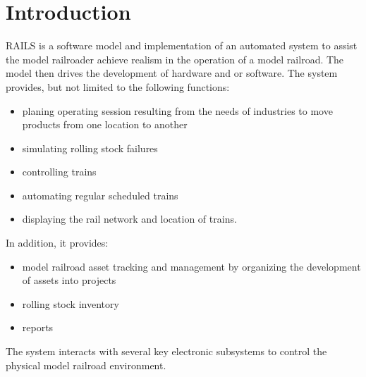 \chapter{Introduction}
\ac{RAILS} is a software model and implementation of an automated system to assist the model railroader achieve realism in the operation of a model railroad. The model then drives the development of hardware and or software.
The system provides, but not limited to the following functions:
\begin{itemize}
  \item planing operating session resulting from the needs of industries to move products from one location to another
  \item simulating rolling stock failures
  \item controlling trains
  \item automating regular scheduled trains 
  \item displaying the rail network and location of trains.
\end{itemize}
In addition, it provides:
\begin{itemize}
  \item model railroad asset tracking and management by organizing the development of assets into projects
  \item rolling stock inventory
  \item reports
\end{itemize} 
The system interacts with several key electronic subsystems to control the physical model railroad environment.
